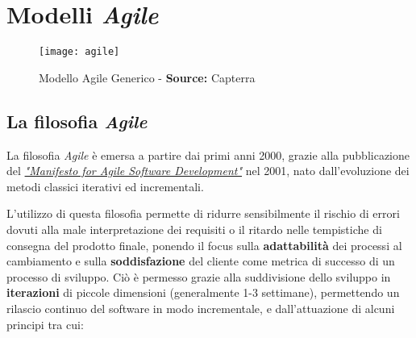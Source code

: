 \documentclass[../main.tex]{subfiles}
\begin{document}
        \section{Modelli \emph{Agile}}
        
        	\begin{figure}[h]
        		\centering
        		\texttt{[image: agile]}
        		\caption{Modello Agile Generico - \textbf{Source:} Capterra}
        		\label{fig:agile_generic}
        	\end{figure}
        
        	\subsection{La filosofia \emph{Agile}}
        		
        		La filosofia \emph{Agile} è emersa a partire dai primi anni 2000, grazie alla pubblicazione del \href{https://agilemanifesto.org/iso/it/principles.html}{\emph{"Manifesto for Agile Software Development"}}\cite{agile_manifesto} nel 2001, nato dall'evoluzione dei metodi classici iterativi ed incrementali.
        		
        		L'utilizzo di questa filosofia permette di ridurre sensibilmente il rischio di errori dovuti alla male interpretazione dei requisiti o il ritardo nelle tempistiche di consegna del prodotto finale, ponendo il focus sulla \textbf{adattabilità} dei processi al cambiamento e sulla \textbf{soddisfazione} del cliente come metrica di successo di un processo di sviluppo.
        		Ciò è permesso grazie alla suddivisione dello sviluppo in \textbf{iterazioni} di piccole dimensioni (generalmente 1-3 settimane), permettendo un rilascio continuo del software in modo incrementale, e dall'attuazione di alcuni principi tra cui:
        		
\end{document}
